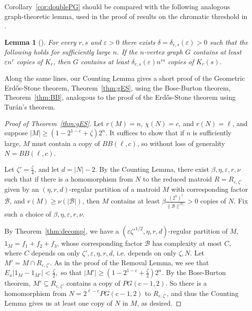 \documentclass{article}
\theoremstyle{plain}
\newtheorem{lem}[theorem]{Lemma}
\theoremstyle{definition}
\theoremstyle{definition}
\theoremstyle{remark}
\numberwithin{equation}{section}
\newcommand{\cB}{\mathcal B}
\begin{document}
Corollary~\ref{cor:doublePG} should be compared with the following analogous graph-theoretic lemma, used in the proof of results on the chromatic threshold in \cite{chromThresh}.

\begin{lem}[{\cite[Lemma~7]{doublingKn}}]
For every $r, s$ and $\varepsilon > 0$ there exists $\delta=\delta_{r,s}(\varepsilon) > 0$ such that the following holds for sufficiently large $n$. If the $n$-vertex graph $G$ contains at least $\varepsilon n^r$ copies of $K_r$, then $G$ contains at least  $\delta_{r,s}(\varepsilon)n^{rs}$ copies of $K_r(s)$.
\end{lem}

Along the same lines, our Counting Lemma gives a short proof of the Geometric Erd\H{o}s-Stone theorem, Theorem~\ref{thm:gES}, using the Bose-Burton theorem, Theorem~\ref{thm:BB}, analogous to the proof of the Erd\H{o}s-Stone theorem using Turán's theorem.

\begin{proof}[Proof of Theorem~\ref{thm:gES}]
Let $r(M)=n$, $\chi(N)=c$, and $r(N)=\ell$, and suppose $|M|\geq (1-2^{1-c}+\zeta)2^n$. It suffices to show that if $n$ is sufficiently large, $M$ must contain a copy of $BB(\ell,c)$, so without loss of generality $N=BB(\ell,c)$.

Let $\zeta'=\frac{\zeta}{4}$, and let $d=|N|-2$. By the Counting Lemma, there exist $\beta, \eta, \varepsilon, r, \nu$ such that if there is a homomorphism from $N$ to the reduced matroid $R=R_{\varepsilon,\zeta'}$ given by an $(\eta,r,d)$-regular partition of a matroid $M$ with corresponding factor $\cB$, and $r(M)\geq \nu(|\cB|)$, then $M$ contains at least $\beta \frac{(2^{n})^{l}}{\|\cB\|^{|N|}}>0$ copies of $N$. Fix such a choice of $\beta,\eta,\varepsilon,r,\nu$.

By Theorem~\ref{thm:decomp}, we have a $(\varepsilon \zeta'^{1/2},\eta,r,d)$-regular partition of $M$, $1_M=f_1+f_2+f_3$, whose corresponding factor $\cB$ has complexity at most $C$, where $C$ depends on only $\zeta',\varepsilon, \eta,r,d$, i.e. depends on only $\zeta, N$. Let $M'=M\cap R_{\varepsilon,\zeta'}$. As in the proof of the Removal Lemma, we see that $E_x{|1_M-1_{M'}|} < \frac{\zeta}{2},$ so that $|M'|\geq (1-2^{1-c}+\frac{\zeta}{2})2^n$. By the Bose-Burton theorem, $M'\subseteq R_{\varepsilon,\zeta'}$ contains a copy of $PG(c-1,2)$. So there is a homomorphism from $N=2^{\ell-c}PG(c-1,2)$ to $R_{\varepsilon,\zeta'}$, and thus the Counting Lemma gives us at least one copy of $N$ in $M$, as desired.
\end{proof}
\end{document}
